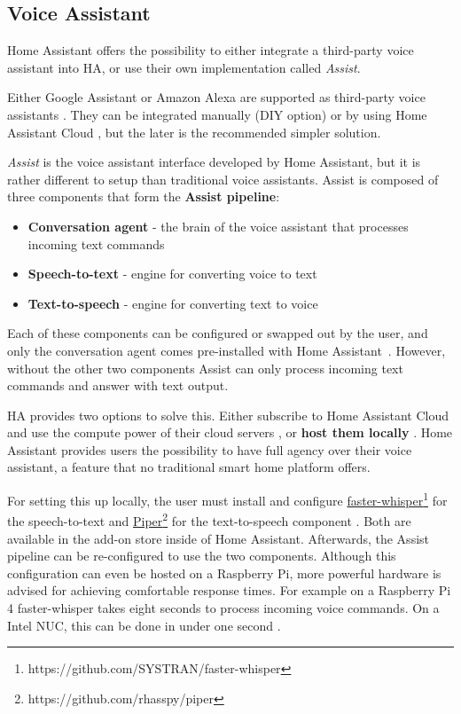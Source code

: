 \subsection{Voice Assistant}
\label{sec:ha-voice-assistant}
Home Assistant offers the possibility to either integrate a third-party voice assistant into HA, or use their own implementation called \textit{Assist}.

Either Google Assistant or Amazon Alexa are supported as third-party voice assistants \cite{HomeAssistant_VoiceControl}. They can be integrated manually (DIY option) \cite{HomeAssistant_GoogleAssistant}\cite{HomeAssistant_AmazonAlexa} or by using Home Assistant Cloud \cite{NabuCasa_Startpage}, but the later is the recommended simpler solution.

\textit{Assist} is the voice assistant interface developed by Home Assistant, but it is rather different to setup than traditional voice assistants. Assist is composed of three components that form the \textbf{Assist pipeline}:

\begin{itemize}
    \item \textbf{Conversation agent} - the brain of the voice assistant that processes incoming text commands
    \item \textbf{Speech-to-text} - engine for converting voice to text
    \item \textbf{Text-to-speech} - engine for converting text to voice
\end{itemize}

Each of these components can be configured or swapped out by the user, and only the conversation agent comes pre-installed with Home Assistant~\cite{HomeAssistant_VoiceControl}. However, without the other two components Assist can only process incoming text commands and answer with text output.

HA provides two options to solve this. Either subscribe to Home Assistant Cloud and use the compute power of their cloud servers \cite{HomeAssistant_Assist_Cloud}, or \textbf{host them locally} \cite{HomeAssistant_Assist_Local}. Home Assistant provides users the possibility to have full agency over their voice assistant, a feature that no traditional smart home platform offers.

For setting this up locally, the user must install and configure \href{https://github.com/SYSTRAN/faster-whisper}{faster-whisper}\footnote{https://github.com/SYSTRAN/faster-whisper} for the speech-to-text and \href{https://github.com/rhasspy/piper}{Piper}\footnote{https://github.com/rhasspy/piper} for the text-to-speech component \cite{HomeAssistant_Assist_Local}. Both are available in the add-on store inside of Home Assistant. Afterwards, the Assist pipeline can be re-configured to use the two components. Although this configuration can even be hosted on a Raspberry Pi, more powerful hardware is advised for achieving comfortable response times. For example on a Raspberry Pi 4 faster-whisper takes eight seconds to process incoming voice commands. On a Intel NUC, this can be done in under one second \cite{HomeAssistant_Assist_Local}.

